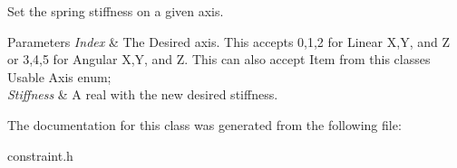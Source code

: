 Set the spring stiffness on a given axis. 


\begin{DoxyParams}{Parameters}
{\em Index} & The Desired axis. This accepts 0,1,2 for Linear X,Y, and Z or 3,4,5 for Angular X,Y, and Z. This can also accept Item from this classes Usable Axis enum; \\
\hline
{\em Stiffness} & A real with the new desired stiffness. \\
\hline
\end{DoxyParams}


The documentation for this class was generated from the following file:\begin{DoxyCompactItemize}
\item 
constraint.h\end{DoxyCompactItemize}
